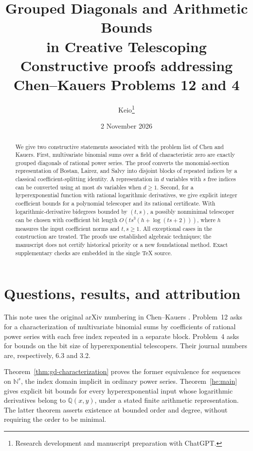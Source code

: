 \documentclass[11pt,a4paper]{article}
\title{Grouped Diagonals and Arithmetic Bounds\\in Creative Telescoping\\[5pt]
\large Constructive proofs addressing Chen--Kauers Problems 12 and 4}
\author{Keio\thanks{Research development and manuscript preparation with ChatGPT.}}
\date{2 November 2026}
\theoremstyle{remark}\newtheorem{remark}[theorem]{Remark}
\begin{document}
\maketitle
\begin{abstract}
We give two constructive statements associated with the problem list of
Chen and Kauers. First, multivariate binomial sums over a field of
characteristic zero are exactly grouped diagonals of rational power series.
The proof converts the monomial-section representation of Bostan, Lairez,
and Salvy into disjoint blocks of repeated indices by a classical
coefficient-splitting identity. A representation in $d$ variables with $s$
free indices can be converted using at most $ds$ variables when $d\ge1$.
Second, for a hyperexponential function with rational logarithmic
derivatives, we give explicit integer coefficient bounds for a polynomial
telescoper and its rational certificate. With logarithmic-derivative
bidegrees bounded by $(t,s)$, a possibly nonminimal telescoper can be chosen
with coefficient bit length $O(ts^3(h+\log(ts+2)))$, where $h$ measures the
input coefficient norms and $t,s\ge1$. All exceptional cases in the
construction are treated. The proofs use established algebraic techniques;
the manuscript does not certify historical priority or a new foundational
method. Exact supplementary checks are embedded in the single TeX source.
\end{abstract}

\section{Questions, results, and attribution}
This note uses the original arXiv numbering in Chen--Kauers
\cite{CK2016}. Problem~12 asks for a characterization of multivariate
binomial sums by coefficients of rational power series with each free
index repeated in a separate block. Problem~4 asks for bounds on the bit
size of hyperexponential telescopers. Their journal numbers are,
respectively, 6.3 and 3.2.

Theorem~\ref{thm:gd-characterization} proves the former equivalence for
sequences on $\mathbb N^s$, the index domain implicit in ordinary power
series. Theorem~\ref{he:main} gives explicit bit bounds for every
hyperexponential input whose logarithmic derivatives belong to
$\mathbb Q(x,y)$, under a stated finite arithmetic representation.
The latter theorem asserts existence at bounded order and degree, without
requiring the order to be minimal.
\end{document}
